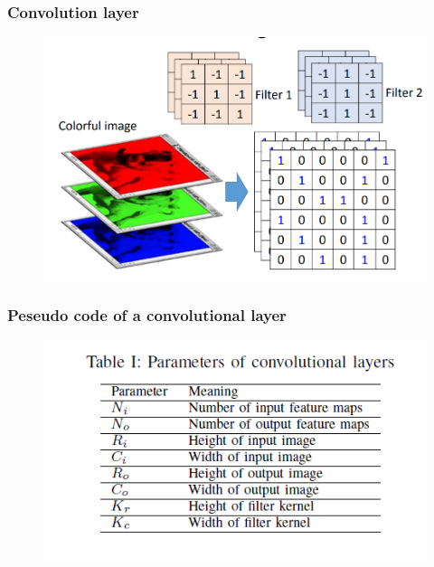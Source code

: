 \begin{frame}
    \frametitle{Convolution layer}
	\begin{figure}
		\includegraphics[scale=0.4]{figure/conv-2.PNG}
	\end{figure}
\end{frame}

\begin{frame}
    \frametitle{Peseudo code of a convolutional layer}
	\begin{figure}
		\includegraphics[scale=0.6]{figure/variable.PNG}
	\end{figure}
\end{frame}

